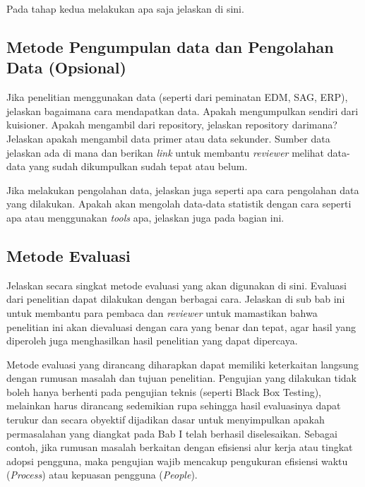 Pada tahap kedua melakukan apa saja jelaskan di sini.

\hypertarget{metode-pengumpulan-data-dan-pengolahan-data-opsional}{%
\subsection{Metode Pengumpulan data dan Pengolahan Data
(Opsional)}\label{metode-pengumpulan-data-dan-pengolahan-data-opsional}}

Jika penelitian menggunakan data (seperti dari peminatan EDM, SAG, ERP),
jelaskan bagaimana cara mendapatkan data. Apakah mengumpulkan sendiri
dari kuisioner. Apakah mengambil dari repository, jelaskan repository
darimana? Jelaskan apakah mengambil data primer atau data sekunder.
Sumber data jelaskan ada di mana dan berikan \emph{link} untuk membantu
\emph{reviewer} melihat data-data yang sudah dikumpulkan sudah tepat
atau belum.

Jika melakukan pengolahan data, jelaskan juga seperti apa cara
pengolahan data yang dilakukan. Apakah akan mengolah data-data statistik
dengan cara seperti apa atau menggunakan \emph{tools} apa, jelaskan juga
pada bagian ini.

\hypertarget{metode-evaluasi}{%
\subsection{Metode Evaluasi}\label{metode-evaluasi}}

Jelaskan secara singkat metode evaluasi yang akan digunakan di sini.
Evaluasi dari penelitian dapat dilakukan dengan berbagai cara. Jelaskan
di sub bab ini untuk membantu para pembaca dan \emph{reviewer} untuk
mamastikan bahwa penelitian ini akan dievaluasi dengan cara yang benar
dan tepat, agar hasil yang diperoleh juga menghasilkan hasil penelitian
yang dapat dipercaya.

Metode evaluasi yang dirancang diharapkan dapat memiliki keterkaitan
langsung dengan rumusan masalah dan tujuan penelitian. Pengujian yang
dilakukan tidak boleh hanya berhenti pada pengujian teknis (seperti
Black Box Testing), melainkan harus dirancang sedemikian rupa sehingga
hasil evaluasinya dapat terukur dan secara obyektif dijadikan dasar
untuk menyimpulkan apakah permasalahan yang diangkat pada Bab I telah
berhasil diselesaikan. Sebagai contoh, jika rumusan masalah berkaitan
dengan efisiensi alur kerja atau tingkat adopsi pengguna, maka pengujian
wajib mencakup pengukuran efisiensi waktu (\emph{Process}) atau kepuasan
pengguna (\emph{People}).

